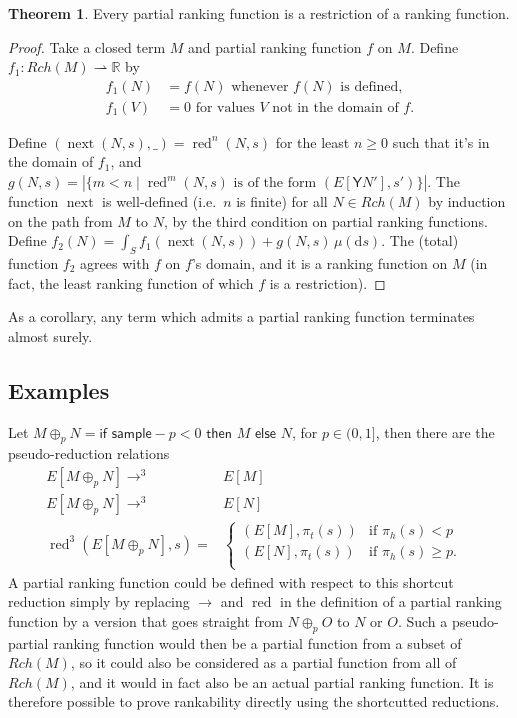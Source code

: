 \documentclass{article}
\newcommand{\tY}{\textsf{Y}}
\newcommand{\tif}[3]{\textsf{if }#1\textsf{ then }#2\textsf{ else }#3}
\newcommand{\tsample}{\textsf{sample}}
\DeclareMathOperator{\red}{red}
\DeclareMathOperator{\nnext}{next}
\theoremstyle{definition}
\theoremstyle{lemma}
\newtheorem{theorem}{Theorem}
\theoremstyle{remark}
\begin{document}
\begin{theorem} \label{partial implies rankable}
Every partial ranking function is a restriction of a ranking function.
\end{theorem}
\begin{proof}
Take a closed term $M$ and partial ranking function $f$ on $M$. Define $f_1 : Rch(M) \rightharpoonup \mathbb R$ by
\begin{align*}
    f_1(N) & = f(N) \text{ whenever $f(N)$ is defined,} \\
    f_1(V) & = 0 \text{ for values $V$ not in the domain of $f$.}
\end{align*}

Define $(\nnext(N,s),\_) = \red^n(N,s)$ for the least $n \geq 0$ such that it's in the domain of $f_1$, and $g(N,s) = \left | \{m < n \mid \red^m(N,s) \text{ is of the form } (E[\tY N'],s') \} \right |$. 
The function $\nnext$ is well-defined (i.e.~$n$ is finite) for all $N \in Rch(M)$ by induction on the path from $M$ to $N$, by the third condition on partial ranking functions. Define $f_2(N) = \int_S f_1(\nnext(N,s)) + g(N,s) \, \mu(\mathrm d s)$. The (total) function $f_2$ agrees with $f$ on $f$'s domain, and it is a ranking function on $M$ (in fact, the least ranking function of which $f$ is a restriction).
\end{proof}


As a corollary, any term which admits a partial ranking function terminates almost surely.

\subsection{Examples}
Let $M \oplus_p N = \tif{\tsample - p < 0} M N$, for $p \in (0,1]$, then there are the pseudo-reduction relations
\begin{align*}
E[M \oplus_p N] \to^3 & E[M] & \\
E[M \oplus_p N] \to^3 & E[N] & \\
\red^3(E[M \oplus_p N], s) = & \left\{
    \begin{array}{ll}
        (E[M],\pi_t(s)) & \text{if } \pi_h(s) < p \\
        (E[N],\pi_t(s)) & \text{if } \pi_h(s) \geq p. \\
    \end{array} \right .
\end{align*}
A partial ranking function could be defined with respect to this shortcut reduction simply by replacing $\to$ and $\red$ in the definition of a partial ranking function by a version that goes straight from $N \oplus_p O$ to $N$ or $O$. Such a pseudo-partial ranking function would then be a partial function from a subset of $Rch(M)$, so it could also be considered as a partial function from all of $Rch(M)$, and it would in fact also be an actual partial ranking function. It is therefore possible to prove rankability directly using the shortcutted reductions.
\end{document}
